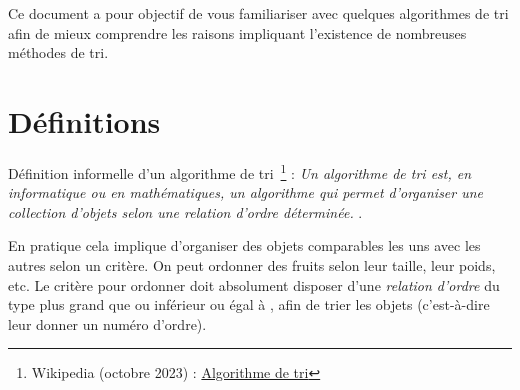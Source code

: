 \documentclass[11pt,a4paper]{article}
\begin{document}
\EncadreTitre

\bigskip


%
%

\bigskip


Ce document a pour objectif de vous familiariser avec quelques algorithmes de tri afin de mieux comprendre les raisons impliquant l'existence de nombreuses méthodes de tri.


\bigskip


\section{Définitions}

Définition informelle d'un algorithme de tri~\footnote{Wikipedia (octobre 2023) : \href{https://fr.wikipedia.org/wiki/Algorithme_de_tri}{Algorithme de tri}} : \og \textit{Un algorithme de tri est, en informatique ou en mathématiques, un algorithme qui permet d'organiser une collection d'objets selon une relation d'ordre déterminée.} \fg .

\bigskip

En pratique cela implique d'organiser des objets comparables les uns avec les autres selon un critère.
On peut ordonner des fruits selon leur taille, leur poids, etc.
Le critère pour ordonner doit absolument disposer d'une \textit{relation d'ordre} du type \og plus grand que \fg{} ou \og inférieur ou égal à \fg{}, afin de trier les objets (c'est-à-dire leur donner un numéro d'ordre).

\bigskip
\end{document}

